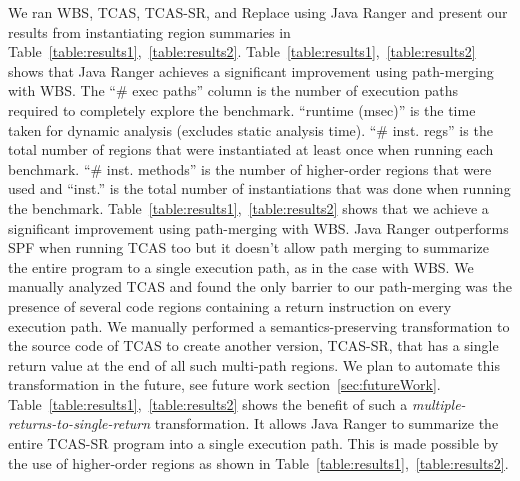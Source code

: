 %

We ran WBS, TCAS, TCAS-SR, and Replace using Java Ranger and present our results from instantiating region summaries
in Table~\ref{table:results1},~\ref{table:results2}.
%
Table~\ref{table:results1},~\ref{table:results2} shows that Java Ranger achieves a significant improvement using path-merging with WBS.
%
The ``\# exec paths'' column is the number of execution paths required to completely explore the benchmark.
%
``runtime (msec)'' is the time taken for dynamic analysis (excludes static analysis time).
%
``\# inst. regs'' is the total number of regions that were instantiated at least once when running each benchmark.
%
``\# inst. methods'' is the number of higher-order regions that were used and ``inst.'' is the total number of
instantiations that was done when running the benchmark.
%
Table~\ref{table:results1},~\ref{table:results2} shows that we achieve a significant improvement using path-merging with WBS.
%
Java Ranger outperforms SPF when running TCAS too but it doesn't allow path merging to summarize the entire program
to a single execution path, as in the case with WBS.
%
We manually analyzed TCAS and found the only barrier to our path-merging was the presence of several code
regions containing a return instruction on every execution path.
%
We manually performed a semantics-preserving transformation to the source code of TCAS to create another version, TCAS-SR,
that has a single return value at the end of all such multi-path regions.
%
We plan to automate this transformation in the future, see future work section~\ref{sec:futureWork}.
%
Table~\ref{table:results1},~\ref{table:results2} shows the benefit of such a \textit{multiple-returns-to-single-return} transformation.
%
It allows Java Ranger to summarize the entire TCAS-SR program into a single execution path.
%
This is made possible by the use of higher-order regions as shown in Table~\ref{table:results1},~\ref{table:results2}.
